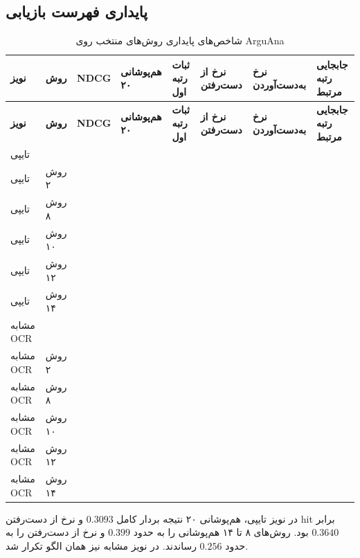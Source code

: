 \documentclass[a4paper,12pt]{article}
\begin{document}
\subsection{پایداری فهرست بازیابی}
\begin{landscape}
\scriptsize
\begin{longtable}{|C{2cm}|C{2.3cm}|C{1.7cm}|C{2.2cm}|C{2.2cm}|C{2.2cm}|C{2.2cm}|C{2.5cm}|}
\caption{شاخص‌های پایداری روش‌های منتخب روی ArguAna}\label{tab:arg-robust}\\
\hline
\textbf{نویز} & \textbf{روش} & \textbf{NDCG} & \textbf{هم‌پوشانی ۲۰} & \textbf{ثبات رتبه اول} & \textbf{نرخ از دست‌رفتن} & \textbf{نرخ به‌دست‌آوردن} & \textbf{جابجایی رتبه مرتبط} \\
\hline
\endfirsthead
\hline
\textbf{نویز} & \textbf{روش} & \textbf{NDCG} & \textbf{هم‌پوشانی ۲۰} & \textbf{ثبات رتبه اول} & \textbf{نرخ از دست‌رفتن} & \textbf{نرخ به‌دست‌آوردن} & \textbf{جابجایی رتبه مرتبط} \\
\hline
\endhead
تایپی &  &  &  &  &  &  &  \\
\hline
تایپی & روش ۲ &  &  &  &  &  &  \\
\hline
تایپی & روش ۸ &  &  &  &  &  &  \\
\hline
تایپی & روش ۱۰ &  &  &  &  &  &  \\
\hline
تایپی & روش ۱۲ &  &  &  &  &  &  \\
\hline
تایپی & روش ۱۴ &  &  &  &  &  &  \\
\hline
مشابه OCR &  &  &  &  &  &  &  \\
\hline
مشابه OCR & روش ۲ &  &  &  &  &  &  \\
\hline
مشابه OCR & روش ۸ &  &  &  &  &  &  \\
\hline
مشابه OCR & روش ۱۰ &  &  &  &  &  &  \\
\hline
مشابه OCR & روش ۱۲ &  &  &  &  &  &  \\
\hline
مشابه OCR & روش ۱۴ &  &  &  &  &  &  \\
\hline
\end{longtable}
\end{landscape}
در نویز تایپی، هم‌پوشانی ۲۰ نتیجه بردار کامل $0.3093$ و نرخ از دست‌رفتن hit برابر $0.3640$ بود. روش‌های ۸ تا ۱۴ هم‌پوشانی را به حدود $0.399$ و نرخ از دست‌رفتن را به حدود $0.256$ رساندند. در نویز مشابه  نیز همان الگو تکرار شد.
\end{document}
